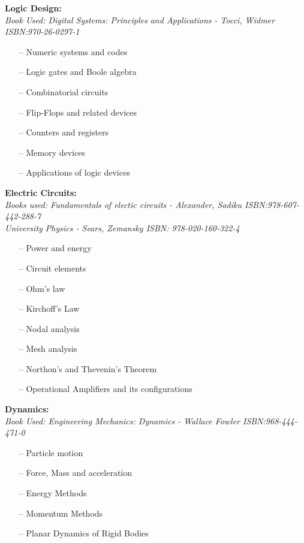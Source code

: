 \documentclass{article}
\begin{document}
\textbf{Logic Design:}\\
    \emph{Book Used: Digital Systems: Principles and Applications - Tocci, Widmer ISBN:970-26-0297-1}
    \begin{itemize}
     \setlength\itemsep{0pt}
    \item[--] Numeric systems and codes
    \item[--] Logic gates and Boole algebra
    \item[--] Combinatorial circuits
    \item[--] Flip-Flops and related devices
    \item[--] Counters and registers
    \item[--] Memory devices
    \item[--] Applications of logic devices
    \end{itemize}

\textbf{Electric Circuits:}\\
    \emph{Books used: Fundamentals of electic circuits - Alexander, Sadiku ISBN:978-607-442-288-7}\\
    \emph{University Physics - Sears, Zemansky ISBN: 978-020-160-322-4}\\
    \begin{itemize}
     \setlength\itemsep{0pt}
    \item[--] Power and energy
    \item[--] Circuit elements
    \item[--] Ohm's law
    \item[--] Kirchoff's Law
    \item[--] Nodal analysis
    \item[--] Mesh analysis
    \item[--] Northon's and Thevenin's Theorem
    \item[--] Operational Amplifiers and its configurations
    \end{itemize}

\textbf{Dynamics:}\\
    \emph{Book Used: Engineering Mechanics: Dynamics - Wallace Fowler ISBN:968-444-471-0  }
    \begin{itemize}
     \setlength\itemsep{0pt}
      \item[--] Particle motion
      \item[--] Force, Mass and acceleration
      \item[--] Energy Methods
      \item[--] Momentum Methods
      \item[--] Planar Dynamics of Rigid Bodies
    \end{itemize}
 
\end{document}
